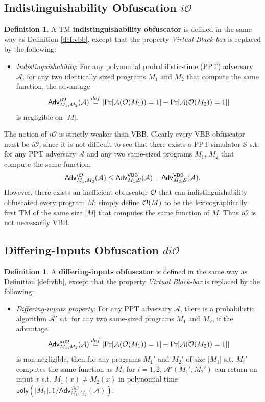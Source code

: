 \documentclass[12pt]{article}
\newcommand{\eqdef}{\stackrel{def}{=}}
\newcommand{\A}{\mathcal{A}}
\newcommand{\Sim}{\mathcal{S}}
\newcommand{\Adv}{\mathsf{Adv}}
\newcommand{\poly}{\mathsf{poly}}
\newcommand{\io}{i\mathcal{O}}
\newcommand{\dio}{di\mathcal{O}}
\theoremstyle{definition}
\newtheorem{definition}[theorem]{Definition}
\begin{document}
\subsection{Indistinguishability Obfuscation $\io$}
\begin{definition}
A TM {\bf indistinguishability obfuscator} is defined in the same way as Definition \ref{def:vbb}, except that the property \emph{Virtual Black-box} is replaced by the following:
\begin{itemize}
\item \emph{Indistinguishability}: For any polynomial probabilistic-time (PPT) adversary $\A$, for any two identically sized programs $M_1$ and $M_2$ that compute the same function, the advantage 
$$\Adv_{M_1,M_2}^{\io}(\A) \eqdef \left| \Pr[\A(\bigoh(M_1)) = 1] - \Pr[\A(\bigoh(M_2)) = 1] \right|$$
is negligible on $|M|$.
\end{itemize}
\end{definition}

The notion of $\io$ is strictly weaker than VBB. Clearly every VBB obfuscator must be $\io$, since it is not difficult to see that there exists a PPT simulator $\Sim$ s.t. for any PPT adversary $\A$ and any two same-sized programs $M_1$, $M_2$ that compute the same function,
$$\Adv_{M_1,M_2}^{\io}(\A) \leq \Adv_{M_1,\Sim}^{\VBB}(\A) + \Adv_{M_2,\Sim}^{\VBB}(\A).$$
However, there exists an inefficient obfuscator $\mathcal{O}$ that can indistinguishability obfuscated every program $M$: simply define $\mathcal{O}(M)$ to be the lexicographically first TM of the same size $|M|$ that computes the same function of $M$. Thus $\io$ is not necessarily VBB.

\subsection{Differing-Inputs Obfuscation $\dio$}
\begin{definition}
\label{def:dio}
A {\bf differing-inputs obfuscator} is defined in the same way as Definition \ref{def:vbb}, except that the property \emph{Virtual Black-box} is replaced by the following:
\begin{itemize}
\item \emph{Differing-inputs property}: For any PPT adversary $\A$, there is a probabilistic algorithm $\A'$ s.t. for any two same-sized programs $M_1$ and $M_2$, if the advantage
$$\Adv_{M_1,M_2}^{\dio}(\A) \eqdef \left| \Pr[\A(\bigoh(M_1))=1] - \Pr[\A(\bigoh(M_2))=1] \right|$$
is non-negligible, then for any programs $M_1'$ and $M_2'$ of size $|M_1|$ s.t. $M_i'$ computes the same function as $M_i$ for $i=1,2$, $\A'(M_1',M_2')$ can return an input $x$ s.t. $M_1(x) \not= M_2(x)$ in polynomial time $\poly(|M_1|, 1/\Adv_{M_1,M_2}^{\dio}(\A))$.
\end{itemize}
\end{definition}
\end{document}
